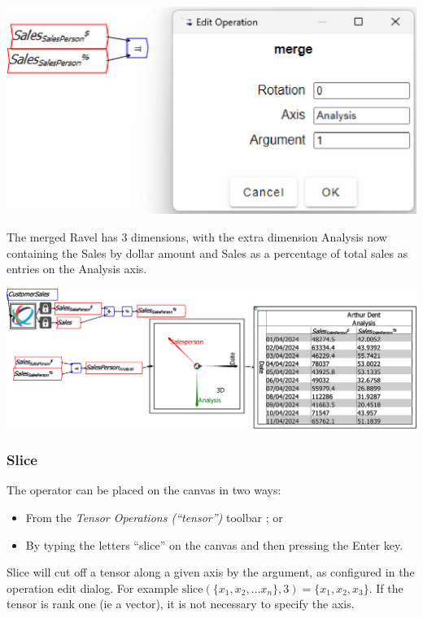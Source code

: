 \noindent\includegraphics[width=\textwidth]{images/MergeExample02TwoVariablesEditForm}

The merged Ravel has 3 dimensions, with the extra dimension Analysis
now containing the Sales by dollar amount and Sales as a percentage
of total sales as entries on the Analysis axis.

\noindent\includegraphics[width=\textwidth]{images/MergeExample03TwoVariablesMerged}

\subsubsection{Slice}

\label{Operation:slice}


The operator can be placed on the canvas in two ways:
\begin{itemize}
\item From the \emph{Tensor Operations (``tensor'')} toolbar ;
or 
\item By typing the letters ``slice'' on the canvas and then pressing the
Enter key.
\end{itemize}
Slice will cut off a tensor along a given axis by the argument, as
configured in the operation edit dialog. For example $\mathrm{slice}(\{x_{1},x_{2},\ldots x_{n}\},3)=\{x_{1},x_{2},x_{3}\}$.
If the tensor is rank one (ie a vector), it is not necessary to specify
the axis.

